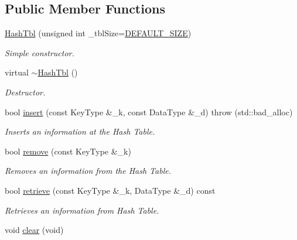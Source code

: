 \subsection*{Public Member Functions}
\begin{DoxyCompactItemize}
\item 
\hyperlink{classHashTbl_aa0526288f0bdd55752dff108551a1689}{Hash\+Tbl} (unsigned int \+\_\+tbl\+Size=\hyperlink{classHashTbl_aeffa5b1a163fb6a09a18fd254a4d6dcf}{D\+E\+F\+A\+U\+L\+T\+\_\+\+S\+I\+ZE})
\begin{DoxyCompactList}\small\item\em Simple constructor. \end{DoxyCompactList}\item 
virtual \hyperlink{classHashTbl_a20c8c81ad708dba82b1c99cf8b59b97f}{$\sim$\+Hash\+Tbl} ()\hypertarget{classHashTbl_a20c8c81ad708dba82b1c99cf8b59b97f}{}\label{classHashTbl_a20c8c81ad708dba82b1c99cf8b59b97f}

\begin{DoxyCompactList}\small\item\em Destructor. \end{DoxyCompactList}\item 
bool \hyperlink{classHashTbl_ac8afd3bd7f88a83f80b2c062ec709997}{insert} (const Key\+Type \&\+\_\+k, const Data\+Type \&\+\_\+d)  throw (std\+::bad\+\_\+alloc)
\begin{DoxyCompactList}\small\item\em Inserts an information at the Hash Table. \end{DoxyCompactList}\item 
bool \hyperlink{classHashTbl_a77c78b51065921e3faabd1be90937415}{remove} (const Key\+Type \&\+\_\+k)
\begin{DoxyCompactList}\small\item\em Removes an information from the Hash Table. \end{DoxyCompactList}\item 
bool \hyperlink{classHashTbl_a1288ed00486f5851d379d446e11a19a0}{retrieve} (const Key\+Type \&\+\_\+k, Data\+Type \&\+\_\+d) const 
\begin{DoxyCompactList}\small\item\em Retrieves an information from Hash Table. \end{DoxyCompactList}\item 
void \hyperlink{classHashTbl_af5643a408cf9e88efc2a136277aa6756}{clear} (void)\hypertarget{classHashTbl_af5643a408cf9e88efc2a136277aa6756}{}\label{classHashTbl_af5643a408cf9e88efc2a136277aa6756}


\end{DoxyCompactItemize}
